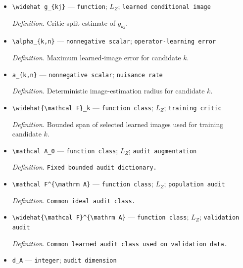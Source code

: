 \documentclass{article}
\begin{document}
\begin{itemize}
  \par\smallskip\noindent\emph{Definition.} \(g_{kj}=T\phi_{kj}\).
  \item \texttt{\textbackslash{}\allowbreak{}widehat g\_\allowbreak{}\{kj\}\allowbreak{}} --- \texttt{function}; \(L_Z\); \texttt{learned conditional image}
  \par\smallskip\noindent\emph{Definition.} Critic-split estimate of \(g_{kj}\).
  \item \texttt{\textbackslash{}\allowbreak{}alpha\_\allowbreak{}\{k,\allowbreak{}n\}\allowbreak{}} --- \texttt{nonnegative scalar}; \texttt{operator-\allowbreak{}learning error}
  \par\smallskip\noindent\emph{Definition.} Maximum learned-image error for candidate \(k\).
  \item \texttt{a\_\allowbreak{}\{k,\allowbreak{}n\}\allowbreak{}} --- \texttt{nonnegative scalar}; \texttt{nuisance rate}
  \par\smallskip\noindent\emph{Definition.} Deterministic image-estimation radius for candidate \(k\).
  \item \texttt{\textbackslash{}\allowbreak{}widehat\{\textbackslash{}\allowbreak{}mathcal F\}\allowbreak{}\_\allowbreak{}k} --- \texttt{function class}; \(L_Z\); \texttt{training critic}
  \par\smallskip\noindent\emph{Definition.} Bounded span of selected learned images used for training candidate \(k\).
  \item \texttt{\textbackslash{}\allowbreak{}mathcal A\_\allowbreak{}0} --- \texttt{function class}; \(L_Z\); \texttt{audit augmentation}
  \par\smallskip\noindent\emph{Definition.} \texttt{Fixed bounded audit dictionary.}
  \item \texttt{\textbackslash{}\allowbreak{}mathcal F\textasciicircum{}\{\textbackslash{}\allowbreak{}mathrm A\}\allowbreak{}} --- \texttt{function class}; \(L_Z\); \texttt{population audit}
  \par\smallskip\noindent\emph{Definition.} \texttt{Common ideal audit class.}
  \item \texttt{\textbackslash{}\allowbreak{}widehat\{\textbackslash{}\allowbreak{}mathcal F\}\allowbreak{}\textasciicircum{}\{\textbackslash{}\allowbreak{}mathrm A\}\allowbreak{}} --- \texttt{function class}; \(L_Z\); \texttt{validation audit}
  \par\smallskip\noindent\emph{Definition.} \texttt{Common learned audit class used on validation data.}
  \item \texttt{d\_\allowbreak{}A} --- \texttt{integer}; \texttt{audit dimension}

\end{itemize}
\end{document}
